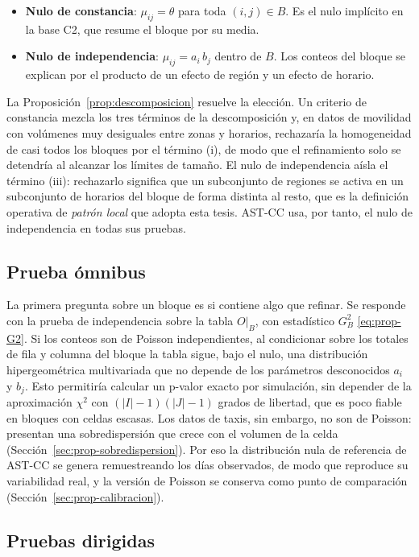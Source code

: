 \begin{itemize}
  \item \textbf{Nulo de constancia}: $\mu_{ij}=\theta$ para toda
  $(i,j)\in B$. Es el nulo implícito en la base C2, que resume el bloque por
  su media.
  \item \textbf{Nulo de independencia}: $\mu_{ij} = a_i\, b_j$ dentro de
  $B$. Los conteos del bloque se explican por el producto de un efecto de
  región y un efecto de horario.
\end{itemize}

La Proposición~\ref{prop:descomposicion} resuelve la elección. Un criterio de
constancia mezcla los tres términos de la descomposición y, en datos de
movilidad con volúmenes muy desiguales entre zonas y horarios, rechazaría la
homogeneidad de casi todos los bloques por el término (i), de modo que el
refinamiento solo se detendría al alcanzar los límites de tamaño. El nulo de
independencia aísla el término (iii): rechazarlo significa que un subconjunto de
regiones se activa en un subconjunto de horarios del bloque de forma distinta
al resto, que es la definición operativa de \emph{patrón local} que adopta esta
tesis. AST-CC usa, por tanto, el nulo de independencia en todas sus pruebas.

\subsection{Prueba ómnibus}

La primera pregunta sobre un bloque es si contiene algo que refinar. Se
responde con la prueba de independencia sobre la tabla $O|_B$, con estadístico
$G^2_B$ \eqref{eq:prop-G2}. Si los conteos son de Poisson independientes, al
condicionar sobre los totales de fila y columna del bloque la tabla sigue, bajo
el nulo, una distribución hipergeométrica multivariada que no depende de los
parámetros desconocidos $a_i$ y $b_j$. Esto permitiría calcular un p-valor
exacto por simulación, sin depender de la aproximación $\chi^2$ con
$(|I|-1)(|J|-1)$ grados de libertad, que es poco fiable en bloques con celdas
escasas. Los datos de taxis, sin embargo, no son de Poisson: presentan una
sobredispersión que crece con el volumen de la celda
(Sección~\ref{sec:prop-sobredispersion}). Por eso la distribución nula de
referencia de AST-CC se genera remuestreando los días observados, de modo que
reproduce su variabilidad real, y la versión de Poisson se conserva como punto
de comparación (Sección~\ref{sec:prop-calibracion}).

\subsection{Pruebas dirigidas}

